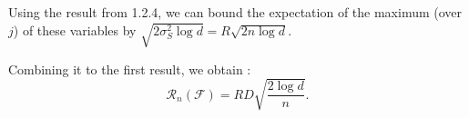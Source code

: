 \begin{questions}
\begin{solution}
        Using the result from 1.2.4, we can bound the expectation of the maximum (over $j$) of these variables by $\sqrt{2 \sigma_S^2 \log{d}} = R \sqrt{2 n \log{d}}$.

        Combining it to the first result, we obtain :
        $$
        \mathcal{R}_n(\mathcal{F}) = RD \sqrt{\frac{2 \log{d}}{n}}.
        $$
    \end{solution}
\end{questions}